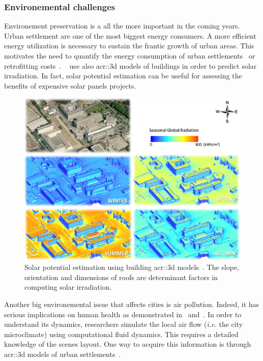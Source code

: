         \subsubsection{Environemental challenges}
            Environement preservation is a all the more important in the coming years.
            Urban settlement are one of the most biggest energy consumers.
            A more efficient energy utilization is necessary to sustain the frantic growth of urban areas.
            This motivates the need to quantify the energy consumption of urban settlements~\parencite{WATE20153372} or retrofitting costs~\parencite{previtali2014automatic}.
            ~\textcite{biljecki2015propagation} use also \gls{acr::3d} models of buildings in order to predict solar irradiation.
            In fact, solar potential estimation can be useful for assessing the benefits of expensive solar panels projects.\\
            \begin{figure}[htpb]
                \centering
                \includegraphics[width=.7\textwidth]{images/3d_model_applications/solar_potential}
                \caption{
                    \label{fig::solar_potential} Solar potential estimation using building \gls{acr::3d} models~\parencite{redweik2013solar}.
                    The slope, orientation and dimensions of roofs are determinant factors in computing solar irradiation.
                }
            \end{figure}
            Another big environemental issue that affects cities is air pollution.
            Indeed, it has serious implications on human health as demonstrated in~\textcite{pascal2013assessing} and~\textcite{chen2013evidence}.
            In order to understand its dynamics, researchers simulate the local air flow (\textit{i.e.} the city microclimate) using computational fluid dynamics.
            This requires a detailed knowledge of the scenes layout.
            One way to acquire this information is through \gls{acr::3d} models of urban settlements~\parencite{ujang2013unified}.
       
